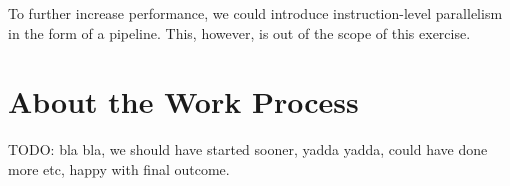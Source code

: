 To further increase performance, we could introduce instruction-level parallelism in the form of a pipeline.
This, however, is out of the scope of this exercise.


\section{About the Work Process}

TODO: bla bla, we should have started sooner, yadda yadda, could have done more etc, happy with final outcome.

